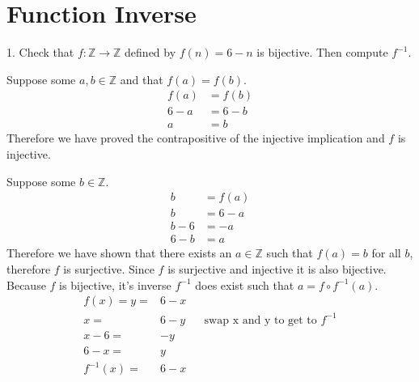 \documentclass{article}
\begin{document}
\section{Function Inverse}

\begin{exercise}{}{}
	{1. Check that $f: \mathbb{Z} \rightarrow \mathbb{Z}$ defined
		by $f(n)=6-n$ is bijective. Then compute $f^{-1}$.}
	\begin{alist}
		\item Suppose some $a, b \in \mathbb{Z}$ and that $f(a) = f(b)$.
		\begin{align*}
			f(a) & =f(b) \\
			6-a  & =6-b  \\
			a    & =b
		\end{align*}
		Therefore we have proved the contrapositive of the injective implication and $f$
		is injective.
		\item Suppose some $b\in \mathbb{Z}$.
		\begin{align*}
			b   & =f(a) \\
			b   & =6-a  \\
			b-6 & =-a   \\
			6-b & =a
		\end{align*}
		Therefore we have shown that there exists an $a\in\mathbb{Z}$ such that $f(a)=b$
		for all $b$, therefore $f$ is surjective. Since $f$ is surjective and injective
		it is also bijective. Because $f$ is bijective, it's inverse $f^{-1}$ does exist
		such that $a=f\circ f^{-1}(a)$.
		\begin{align*}
			f(x)=y=    & 6-x                                           \\
			x=         & 6-y &  & \text{swap x and y to get to }f^{-1} \\
			x-6=       & -y                                            \\
			6-x=       & y                                             \\
			f^{-1}(x)= & 6-x
		\end{align*}
	\end{alist}
\end{exercise}{}{}
\end{document}
